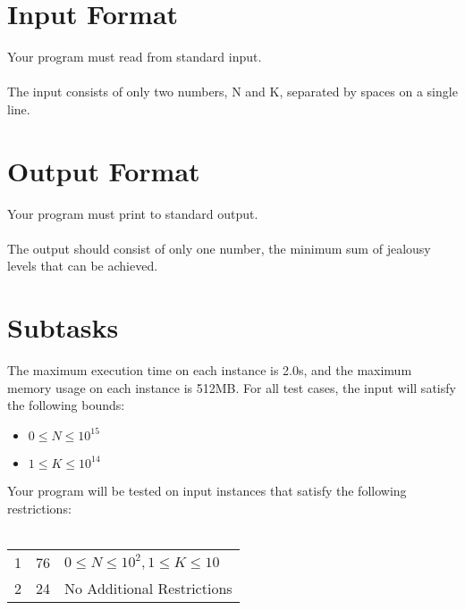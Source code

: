 \documentclass{report}
\begin{document}
\section*{Input Format}
Your program must read from standard input.
\\\\
The input consists of only two numbers, N and K, separated by spaces on a single line. 

\section*{Output Format}
Your program must print to standard output.
\\\\
The output should consist of only one number, the minimum sum of jealousy levels that can be achieved.

\section*{Subtasks}
The maximum execution time on each instance is 2.0s, and the maximum memory usage on each instance is 512MB. For all test cases, the input will satisfy the following bounds:

\begin{itemize}
    \item \(0 \leq N \leq 10^{15}\)
    \item \(1 \leq K \leq 10^{14}\)
\end{itemize}

Your program will be tested on input instances that satisfy the following restrictions:
\\\\
\begin{tabularx}{\textwidth}{
    |P{\dimexpr.15\arrayrulewidth}
    |P{\dimexpr.15\arrayrulewidth}
    |P{\dimexpr.7\arrayrulewidth}|
    }
    \hline
     &  &    
    \\ \hline
        
    1 & 76 & $0 \leq N \leq 10^2, 1 \leq K \leq 10$ \\  & 24 & No Additional Restrictions \\ \hline
 
\end{tabularx}

\pagebreak
\end{document}
